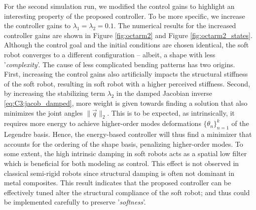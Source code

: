 \begin{example}
For the second simulation run, we modified the control gains to highlight an interesting property of the proposed controller. To be more specific, we increase the controller gains to $\lambda_1 = \lambda_2 = 0.1$. The numerical results for the increased controller gains are shown in Figure \ref{fig:octarm2} and Figure \ref{fig:octarm2_states}. Although the control goal and the initial conditions are chosen identical, the soft robot converges to a different configuration -- albeit, a shape with less '\textit{complexity}'. The cause of less complicated bending patterns has two origins. First, increasing the control gains also artificially impacts the structural stiffness of the soft robot, resulting in soft robot with a higher perceived stiffness. Second, by increasing the stabilizing term $\lambda_2$ in the damped Jacobian inverse \eqref{eq:C3:jacob_damped}, more weight is given towards finding a solution that also minimizes the joint angles $\lVert \vec{q} \rVert_2 $.  This is to be expected, as intrinsically, it requires more energy to achieve higher-order modes deformations $\{\theta_n\}_{n=1}^k$ of the Legendre basis. Hence, the energy-based controller will thus find a minimizer that accounts for the ordering of the shape basis, penalizing higher-order modes. To some extent, the high intrinsic damping in soft robots acts as a spatial low filter which is beneficial for both modeling as control. This effect is not observed in classical semi-rigid robots since structural damping is often not dominant in metal composites.  This result indicates that the proposed controller can be effectively tuned alter the structural compliance of the soft robot; and thus could be implemented carefully to preserve '\textit{softness}'. 

\end{example}


